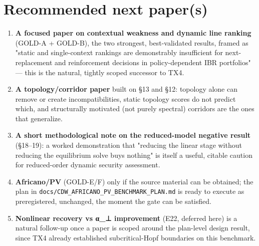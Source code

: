 \documentclass[10pt,a4paper]{article}
\begin{document}
\section{Recommended next paper(s)}
\begin{enumerate}
\item \textbf{A focused paper on contextual weakness and dynamic line ranking} (GOLD-A + GOLD-B), the two strongest, best-validated results, framed as "static and single-context rankings are demonstrably insufficient for next-replacement and reinforcement decisions in policy-dependent IBR portfolios" — this is the natural, tightly scoped successor to TX4.
\item \textbf{A topology/corridor paper} built on §13 and §12: topology alone can remove or create incompatibilities, static topology scores do not predict which, and structurally motivated (not purely spectral) corridors are the ones that generalize.
\item \textbf{A short methodological note on the reduced-model negative result} (§18–19): a worked demonstration that "reducing the linear stage without reducing the equilibrium solve buys nothing" is itself a useful, citable caution for reduced-order dynamic security assessment.
\item \textbf{Africano/PV} (GOLD-E/F) only if the source material can be obtained; the plan in \texttt{docs/\allowbreak{}CDW\_\allowbreak{}AFRICANO\_\allowbreak{}PV\_\allowbreak{}BENCHMARK\_\allowbreak{}PLAN.md} is ready to execute as preregistered, unchanged, the moment the gate can be satisfied.
\item \textbf{Nonlinear recovery vs α\_⊥ improvement} (E22, deferred here) is a natural follow-up once a paper is scoped around the plan-level design result, since TX4 already established subcritical-Hopf boundaries on this benchmark.
\end{enumerate}
\end{document}
